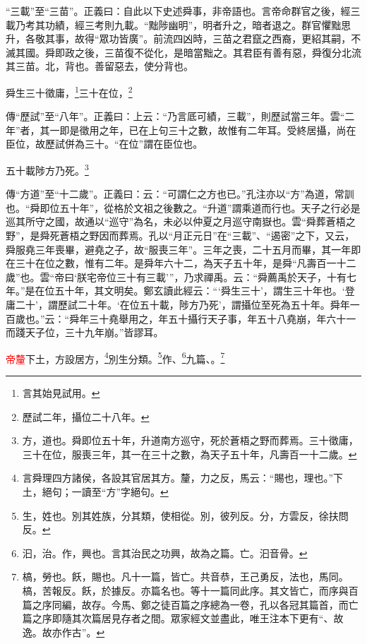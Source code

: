 {\noindent\shu{}\fzkt “三載”至“三苗”。正義曰：自此以下史述舜事，非帝語也。言帝命群官之後，經三載乃考其功績，經三考則九載。“黜陟幽明”，明者升之，暗者退之。群官懼黜思升，各敬其事，故得“眾功皆廣”。前流四凶時，三苗之君竄之西裔，更紹其嗣，不滅其國。舜即政之後，三苗復不從化，是暗當黜之。其君臣有善有惡，舜復分北流其三苗。北，背也。善留惡去，使分背也。 \par}

舜生三十徵庸，\footnote{言其始見試用。}三十在位，\footnote{歷試二年，攝位二十八年。}

{\noindent\zhuan{}\fzbyks 傳“歷試”至“八年”。正義曰：上云：“乃言厎可績，三載”，則歷試當三年。雲“二年”者，其一即是徵用之年，已在上句三十之數，故惟有二年耳。受終居攝，尚在臣位，故歷試併為三十。“在位”謂在臣位也。 \par}

五十載陟方乃死。\footnote{方，道也。舜即位五十年，升道南方巡守，死於蒼梧之野而葬焉。三十徵庸，三十在位，服喪三年，其一在三十之數，為天子五十年，凡壽百一十二歲。}

{\noindent\zhuan{}\fzbyks 傳“方道”至“十二歲”。正義曰：云：“可謂仁之方也已。”孔注亦以“方”為道，常訓也。“舜即位五十年”，從格於文祖之後數之。“升道”謂乘道而行也。天子之行必是巡其所守之國，故通以“巡守”為名，未必以仲夏之月巡守南嶽也。雲“舜葬蒼梧之野”，是舜死蒼梧之野因而葬焉。孔以“月正元日”在“三載”、“遏密”之下，又云，舜服堯三年喪畢，避堯之子，故“服喪三年”。三年之喪，二十五月而畢，其一年即在三十在位之數，惟有二年。是舜年六十二，為天子五十年，是舜“凡壽百一十二歲”也。雲“帝曰‘朕宅帝位三十有三載’”，乃求禪禹。云：“舜薦禹於天子，十有七年。”是在位五十年，其文明矣。鄭玄讀此經云：“‘舜生三十’，謂生三十年也。‘登庸二十’，謂歷試二十年。‘在位五十載，陟方乃死’，謂攝位至死為五十年。舜年一百歲也。”云：“舜年三十堯舉用之，年五十攝行天子事，年五十八堯崩，年六十一而踐天子位，三十九年崩。”皆謬耳。 \par}

\textcolor{red}{帝釐}下土，方設居方，\footnote{言舜理四方諸侯，各設其官居其方。釐，力之反，馬云：“賜也，理也。”下土，絕句；一讀至“方”字絕句。}別生分類。\footnote{生，姓也。別其姓族，分其類，使相從。別，彼列反。分，方雲反，徐扶問反。}作、\footnote{汩，治。作，興也。言其治民之功興，故為之篇。亡。汩音骨。}九篇、\CJKunderwave{\textcolor{red}{槁飫}}。\footnote{槁，勞也。飫，賜也。凡十一篇，皆亡。共音恭，王己勇反，法也，馬同。槁，苦報反。飫，於據反。亦篇名也。等十一篇同此序。其文皆亡，而序與百篇之序同編，故存。今馬、鄭之徒百篇之序總為一卷，孔以各冠其篇首，而亡篇之序即隨其次篇居見存者之間。眾家經文並盡此，唯王注本下更有“、故逸。故亦作古”。}

